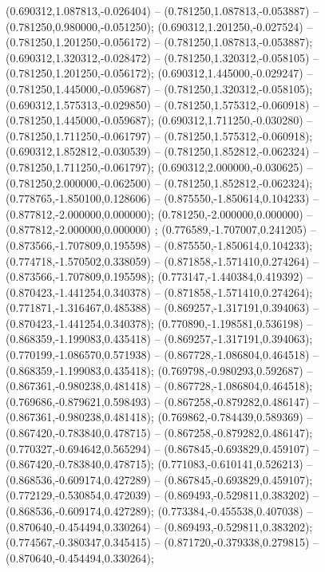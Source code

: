  (0.690312,1.087813,-0.026404) -- (0.781250,1.087813,-0.053887) -- (0.781250,0.980000,-0.051250);
 (0.690312,1.201250,-0.027524) -- (0.781250,1.201250,-0.056172) -- (0.781250,1.087813,-0.053887);
 (0.690312,1.320312,-0.028472) -- (0.781250,1.320312,-0.058105) -- (0.781250,1.201250,-0.056172);
 (0.690312,1.445000,-0.029247) -- (0.781250,1.445000,-0.059687) -- (0.781250,1.320312,-0.058105);
 (0.690312,1.575313,-0.029850) -- (0.781250,1.575312,-0.060918) -- (0.781250,1.445000,-0.059687);
 (0.690312,1.711250,-0.030280) -- (0.781250,1.711250,-0.061797) -- (0.781250,1.575312,-0.060918);
 (0.690312,1.852812,-0.030539) -- (0.781250,1.852812,-0.062324) -- (0.781250,1.711250,-0.061797);
 (0.690312,2.000000,-0.030625) -- (0.781250,2.000000,-0.062500) -- (0.781250,1.852812,-0.062324);
 (0.778765,-1.850100,0.128606) -- (0.875550,-1.850614,0.104233) -- (0.877812,-2.000000,0.000000);
 (0.781250,-2.000000,0.000000) -- (0.877812,-2.000000,0.000000) ;
 (0.776589,-1.707007,0.241205) -- (0.873566,-1.707809,0.195598) -- (0.875550,-1.850614,0.104233);
 (0.774718,-1.570502,0.338059) -- (0.871858,-1.571410,0.274264) -- (0.873566,-1.707809,0.195598);
 (0.773147,-1.440384,0.419392) -- (0.870423,-1.441254,0.340378) -- (0.871858,-1.571410,0.274264);
 (0.771871,-1.316467,0.485388) -- (0.869257,-1.317191,0.394063) -- (0.870423,-1.441254,0.340378);
 (0.770890,-1.198581,0.536198) -- (0.868359,-1.199083,0.435418) -- (0.869257,-1.317191,0.394063);
 (0.770199,-1.086570,0.571938) -- (0.867728,-1.086804,0.464518) -- (0.868359,-1.199083,0.435418);
 (0.769798,-0.980293,0.592687) -- (0.867361,-0.980238,0.481418) -- (0.867728,-1.086804,0.464518);
 (0.769686,-0.879621,0.598493) -- (0.867258,-0.879282,0.486147) -- (0.867361,-0.980238,0.481418);
 (0.769862,-0.784439,0.589369) -- (0.867420,-0.783840,0.478715) -- (0.867258,-0.879282,0.486147);
 (0.770327,-0.694642,0.565294) -- (0.867845,-0.693829,0.459107) -- (0.867420,-0.783840,0.478715);
 (0.771083,-0.610141,0.526213) -- (0.868536,-0.609174,0.427289) -- (0.867845,-0.693829,0.459107);
 (0.772129,-0.530854,0.472039) -- (0.869493,-0.529811,0.383202) -- (0.868536,-0.609174,0.427289);
 (0.773384,-0.455538,0.407038) -- (0.870640,-0.454494,0.330264) -- (0.869493,-0.529811,0.383202);
 (0.774567,-0.380347,0.345415) -- (0.871720,-0.379338,0.279815) -- (0.870640,-0.454494,0.330264);
